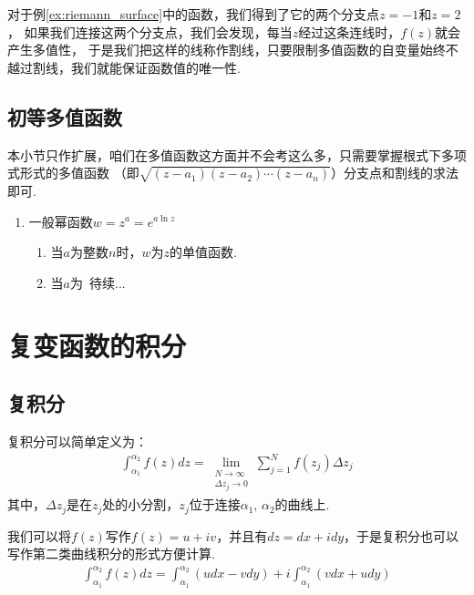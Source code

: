         对于例\ref{ex:riemann_surface}中的函数，我们得到了它的两个分支点$z = -1$和$z = 2$，
        如果我们连接这两个分支点，我们会发现，每当$z$经过这条连线时，$f(z)$就会产生多值性，
        于是我们把这样的线称作割线，只要限制多值函数的自变量始终不越过割线，我们就能保证函数值的唯一性.
        

    \subsection{初等多值函数}
        本小节只作扩展，咱们在多值函数这方面并不会考这么多，只需要掌握根式下多项式形式的多值函数
        （即$\sqrt{(z - a_1)(z - a_2)\cdots(z - a_n)}$）分支点和割线的求法即可.

        \begin{enumerate}
            \item 一般幂函数$w = z^a = e^{a \ln{z}}$
                \begin{enumerate}[(1)]
                    \item 当$a$为整数$n$时，$w$为$z$的单值函数.
                    \item 当$a$为\ 待续... %
                \end{enumerate}
        \end{enumerate}

\section{复变函数的积分}

    \subsection{复积分}
        \begin{definition}[复积分]\label{the:complex_integral}
            复积分可以简单定义为：
            \begin{align*}
                \int_{\alpha_1}^{\alpha_2}f(z)dz 
                = \lim_{\substack{N \to \infty \\
                \varDelta z_j \to 0}}
                \sum_{j = 1}^{N}f(z_j)\varDelta z_j
            \end{align*}
            其中，$\varDelta z_j$是在$z_j$处的小分割，$z_j$位于连接$\alpha_1, \, \alpha_2$的曲线上.
        \end{definition}

        我们可以将$f(z)$写作$f(z) = u + iv$，并且有$dz = dx + idy$，于是复积分也可以写作第二类曲线积分的形式方便计算.
        \begin{align}
            \int_{\alpha_1}^{\alpha_2}f(z)dz = \int_{\alpha_1}^{\alpha_2}(udx - vdy) + i \int_{\alpha_1}^{\alpha_2}(vdx + udy)
        \end{align}

